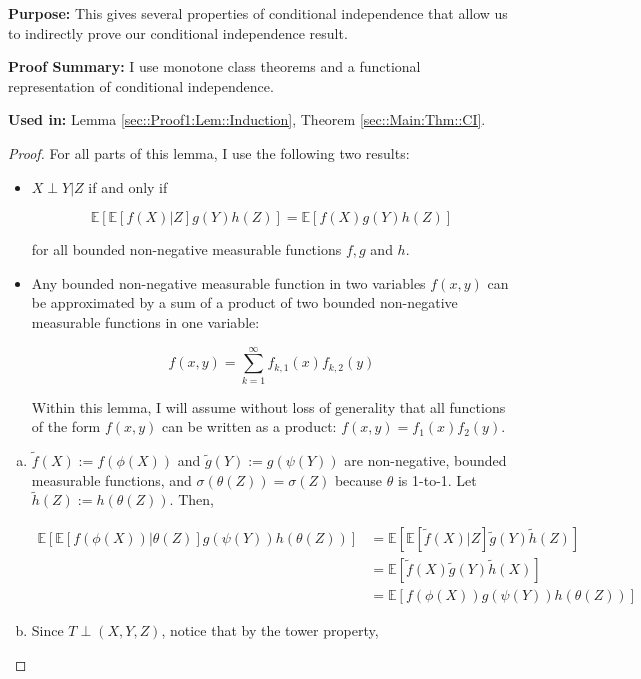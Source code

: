 \documentclass[12pt]{article}
\newcommand{\mb}{\mathbb}
\newcommand{\purpose}{\textbf{Purpose: }}
\newcommand{\pfsum}{\textbf{Proof Summary: }}
\newcommand{\usein}{\textbf{Used in: }}
\newcommand{\ex}[1]{\mb{E}\left[#1\right]}			%
\newcommand{\x}{x}								%
\newcommand{\X}{X}								%
\newcommand{\cind}[1]{_{#1}}					%
\newcommand{\indx}[1]{_{#1}}					%
\newcommand{\XX}{Y}								%
\newcommand{\XXX}{Z}							%
\newcommand{\xx}{y}								%
\newcommand{\indxcind}[2]{_{#1,#2}}				%
\begin{document}
\purpose This gives several properties of conditional independence that allow us to indirectly prove our conditional independence result.

\pfsum I use monotone class theorems and a functional representation of conditional independence.

\usein Lemma \ref{sec::Proof1:Lem::Induction}, Theorem \ref{sec::Main:Thm::CI}.

\begin{proof}
For all parts of this lemma, I use the following two results:

\begin{itemize}
\item \(\X\perp \XX|\XXX\) if and only if

\[\ex{\ex{f(\X)|\XXX}g(\XX)h(\XXX)} = \ex{f(\X)g(\XX)h(\XXX)}\]

for all bounded non-negative measurable functions \(f,g\) and \(h\).

\item Any bounded non-negative measurable function in two variables \(f(\x,\xx)\) can be approximated by a sum of a product of two bounded non-negative measurable functions in one variable:

\[f(\x,\xx) = \sum_{k=1}^\infty f\indxcind{k}{1}(\x)f\indxcind{k}{2}(\xx)\]

Within this lemma, I will assume without loss of generality that all functions of the form \(f(\x,\xx)\) can be written as a product: \(f(\x,\xx) = f\indx{1}(\x)f\indx{2}(\xx)\).
\end{itemize}

\begin{enumerate}[(a)]
\item \(\tilde{f}(\X):=f(\phi(\X))\) and \(\tilde{g}(\XX):=g(\psi(\XX))\) are non-negative, bounded measurable functions, and \(\sigma(\theta(\XXX)) = \sigma(\XXX)\) because \(\theta\) is 1-to-1. Let \(\tilde{h}(\XXX):= h(\theta(\XXX))\). Then,

\begin{align*}
\ex{\ex{f(\phi(\X))|\theta(\XXX)}g(\psi(\XX))h(\theta(\XXX))} &= \ex{\ex{\tilde{f}(\X)|\XXX}\tilde{g}(\XX)\tilde{h}(\XXX)}\\
& = \ex{\tilde{f}(\X)\tilde{g}(\XX)\tilde{h}(\X)}\\
& = \ex{f(\phi(\X))g(\psi(\XX))h(\theta(\XXX))}
\end{align*}

\item Since \(T\perp (\X,\XX,\XXX)\), notice that by the tower property,


\end{enumerate}
\end{proof}
\end{document}
